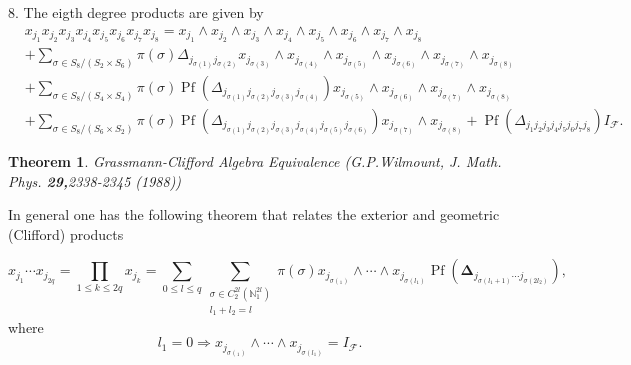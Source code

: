 \documentclass[aps, preprint]{revtex4}
\newtheorem{theorem}{Theorem}
\begin{document}
8. The eigth degree products are given by
\begin{align} & x_{j_{1}} x_{j_{2}} x_{j_{3}} x_{j_{4}} x_{j_{5}} x_{j_{6}} x_{j_{7}} x_{j_{8}} =x_{j_{1}} \wedge x_{j_{2}} \wedge x_{j_{3}} \wedge x_{j_{4}} \wedge x_{j_{5}} \wedge x_{j_{6}} \wedge x_{j_{7}} \wedge x_{j_{8}} \nonumber  \\
 &  +\sum _{\sigma  \in S_{8}/\left (S_{2} \times S_{6}\right )}\pi  \left (\sigma \right )  \Delta _{j_{\sigma  \left (1\right )} j_{\sigma  \left (2\right )}}x_{j_{\sigma  \left (3\right )}} \wedge x_{j_{\sigma  \left (4\right )}} \wedge x_{j_{\sigma  \left (5\right )}} \wedge x_{j_{\sigma  \left (6\right )}} \wedge x_{j_{\sigma  \left (7\right )}} \wedge x_{j_{\sigma  \left (8\right )}} \nonumber  \\
 &  +\sum _{\sigma  \in S_{8}/\left (S_{4} \times S_{4}\right )}\pi  \left (\sigma \right ) \ensuremath{\operatorname*{Pf}} \left ( \Delta _{j_{\sigma  \left (1\right )} j_{\sigma  \left (2\right )} j_{\sigma  \left (3\right )} j_{\sigma  \left (4\right )}}\right ) x_{j_{\sigma  \left (5\right )}} \wedge x_{j_{\sigma  \left (6\right )}} \wedge x_{j_{\sigma  \left (7\right )}} \wedge x_{j_{\sigma  \left (8\right )}} \nonumber  \\
 &  +\sum _{\sigma  \in S_{8}/\left (S_{6} \times S_{2}\right )}\pi  \left (\sigma \right ) \ensuremath{\operatorname*{Pf}} \left ( \Delta _{j_{\sigma  \left (1\right )} j_{\sigma  \left (2\right )} j_{\sigma  \left (3\right )} j_{\sigma  \left (4\right )} j_{\sigma  \left (5\right )} j_{\sigma  \left (6\right )}}\right ) x_{j_{\sigma  \left (7\right )}} \wedge x_{j_{\sigma  \left (8\right )}} +\ensuremath{\operatorname*{Pf}} \left ( \Delta _{j_{1} j_{2} j_{3} j_{4} j_{5} j_{6} j_{7} j_{8}}\right ) I_{\mathcal{F}}\text{.}\end{align}


\begin{theorem}
Grassmann-Clifford Algebra Equivalence (G.P.Wilmount, J. Math. Phys. \textbf{29,}2338-2345 (1988)) 
\end{theorem}

In
general one has the following theorem that relates the exterior and geometric (Clifford) products 

\begin{equation}x_{j_{1}} \cdots  x_{j_{2 q}} ={\displaystyle\prod _{1 \leq k \leq 2 q}}x_{j_{k}} ={\displaystyle\sum _{0 \leq l \leq q}}{\displaystyle\sum _{\begin{array}{c}\sigma  \in C_{2}^{2 l} \left (\mathbb{N}_{1}^{2 l}\right ) \\
l_{1} +l_{2} =l\end{array}}}\pi  \left (\sigma \right ) x_{j_{\sigma  \left (_{1}\right )}} \wedge \cdots  \wedge x_{j_{\sigma  \left (l_{1}\right )}} \ensuremath{\operatorname*{Pf}} \left (\mathbf{\Delta }_{j_{\sigma  \left (l_{1} +1\right )} \cdots  j_{\sigma  \left (2 l_{2}\right )}}\right )\text{,}
\end{equation}where
\begin{equation}l_{1} =0 \Longrightarrow x_{j_{\sigma  \left (_{1}\right )}} \wedge \cdots  \wedge x_{j_{\sigma  \left (l_{1}\right )}} =I_{\mathcal{F}}\text{.}
\end{equation}
\end{document}
